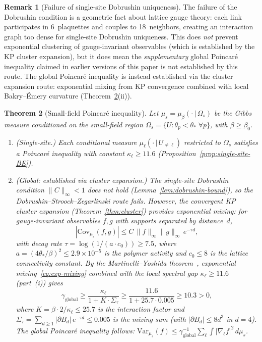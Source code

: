 \documentclass[11pt]{article}
\newtheorem{theorem}{Theorem}[section]
\theoremstyle{definition}
\newtheorem{remark}[theorem]{Remark}
\begin{document}
\begin{remark}[Failure of single-site Dobrushin uniqueness]
\label{rem:dobrushin-fails}
The failure of the Dobrushin condition is a geometric fact about
lattice gauge theory: each link participates in 6~plaquettes and
couples to 18~neighbors, creating an interaction graph too dense
for single-site Dobrushin uniqueness.  This does \emph{not}
prevent exponential clustering of gauge-invariant observables (which
is established by the KP cluster expansion), but it does mean the
\emph{supplementary} global Poincar\'e inequality claimed in earlier
versions of this paper is not established by this route.
The global Poincar\'e inequality is instead established
via the cluster expansion route: exponential mixing from
KP convergence combined with local Bakry--\'Emery curvature
(Theorem~\ref{thm:poincare}(ii)).
\end{remark}

\begin{theorem}[Small-field Poincar\'e inequality]%
\label{thm:poincare}
Let $\mu_s=\mu_\beta(\cdot\,|\,\Omega_s)$ be the Gibbs measure
conditioned on the small-field region
$\Omega_s=\{U:\theta_p<\theta_*\;\forall p\}$, with $\beta\ge\beta_0$.
\begin{enumerate}[nosep,label=(\roman*)]
\item \emph{(Single-site.)}  Each conditional measure
$\mu_\ell(\cdot\,|\,U_{\neq\ell})$ restricted to $\Omega_s$
satisfies a Poincar\'e inequality with constant
$\kappa_\ell\ge 11.6$
(Proposition~\ref{prop:single-site-BE}).
\item \emph{(Global: established via cluster expansion.)}
The single-site Dobrushin condition $\|C\|_\infty<1$ does not hold
(Lemma~\ref{lem:dobrushin-bound}), so the
Dobrushin--Stroock--Zegarlinski route fails.
However, the convergent KP cluster expansion
(Theorem~\ref{thm:cluster}) provides exponential mixing:
for gauge-invariant observables $f,g$ with supports separated
by distance~$d$,
\begin{equation}\label{eq:exp-mixing}
|\mathrm{Cov}_{\mu_s}(f,g)|
\le C\,\|f\|_\infty\|g\|_\infty\,e^{-\tau d},
\end{equation}
with decay rate $\tau=\log(1/(a\cdot c_0))\ge 7.5$,
where $a=(4\theta_*/\beta)^2\le 2.9\times 10^{-5}$ is the
polymer activity and $c_0\le 8$ is the lattice connectivity
constant.  By the Martinelli--Yoshida
theorem~\cite{Martinelli99,Yoshida99},
exponential mixing~\eqref{eq:exp-mixing} combined with the
local spectral gap $\kappa_\ell\ge 11.6$ (part~(i)) gives
\begin{equation}\label{eq:global-gap}
\gamma_{\mathrm{global}}
\ge\frac{\kappa_\ell}{1+K\cdot\Sigma_\tau}
\ge\frac{11.6}{1+25.7\cdot 0.005}
\ge 10.3>0,
\end{equation}
where $K=\beta\cdot 2/\kappa_\ell\le 25.7$ is the interaction
factor and $\Sigma_\tau=\sum_{d\ge 1}|\partial B_d|\,e^{-\tau d}
\le 0.005$ is the mixing sum (with $|\partial B_d|\le 8d^3$
in $d=4$).  The global Poincar\'e inequality follows:
$\mathrm{Var}_{\mu_s}(f)
\le\gamma_{\mathrm{global}}^{-1}\sum_\ell
\int|\nabla_\ell f|^2\,d\mu_s$.
\end{enumerate}
\end{theorem}
\end{document}
